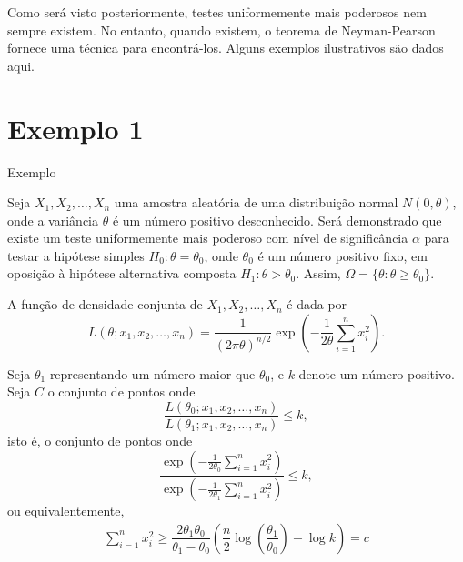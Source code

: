 \documentclass[12pt]{beamer}
\begin{document}
\begin{frame}{}
\begin{block}{}
\justifying
Como será visto posteriormente, testes uniformemente mais poderosos nem sempre existem. No entanto, quando existem, o teorema de Neyman-Pearson fornece uma técnica para encontrá-los. Alguns exemplos ilustrativos são dados aqui.
\end{block}
\end{frame}

\section{Exemplo 1}
\begin{frame}{Exemplo}
\begin{block}{}
\justifying
Seja $X_1, X_2, \ldots, X_n$ uma amostra aleatória de uma distribuição normal $N(0, \theta)$, onde a variância $\theta$ é um número positivo desconhecido. Será demonstrado que existe um teste uniformemente mais poderoso com nível de significância $\alpha$ para testar a hipótese simples $H_0: \theta = \theta_0$, onde $\theta_0$ é um número positivo fixo, em oposição à hipótese alternativa composta $H_1: \theta > \theta_0$. Assim, $\Omega = \{\theta : \theta \geq \theta_0\}$.

A função de densidade conjunta de $X_1, X_2, \ldots, X_n$ é dada por
\begin{equation}
L(\theta; x_1, x_2, \ldots, x_n) = \frac{1}{(2\pi\theta)^{n/2}} \exp\left(-\frac{1}{2\theta}\sum_{i=1}^{n}x_i^2\right).
\end{equation}
\end{block}
\end{frame}

\begin{frame}{}
\begin{block}{}
\justifying
Seja $\theta_1$ representando um número maior que $\theta_0$, e $k$ denote um número positivo. Seja $C$ o conjunto de pontos onde
\begin{equation}
\frac{L(\theta_0; x_1, x_2, \ldots, x_n)}{L(\theta_1; x_1, x_2, \ldots, x_n)} \leq k,
\end{equation}
isto é, o conjunto de pontos onde
\begin{equation}
\frac{\exp\left(-\frac{1}{2\theta_0}\sum_{i=1}^{n}x_i^2\right)}{\exp\left(-\frac{1}{2\theta_1}\sum_{i=1}^{n}x_i^2\right)} \leq k,
\end{equation}
ou equivalentemente,
\begin{align*}
\sum_{i=1}^{n}x_i^2 \geq \dfrac{2\theta_1\theta_0}{\theta_1-\theta_0}\left(\dfrac{n}{2}\log{\left(\dfrac{\theta_1}{\theta_0}\right)}-\log{k}\right)=c
\end{align*}
\end{block}
\end{frame}
\end{document}
